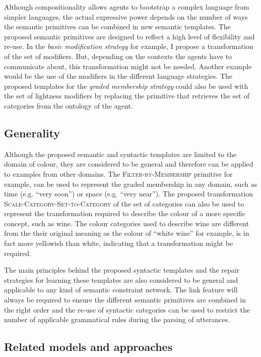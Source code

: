 Although compositionality allows agents to bootstrap a complex
language from simpler languages, the actual expressive power depends
on the number of ways the semantic primitives can be combined in new semantic templates.
The proposed semantic primitives
are designed to reflect a high level of flexibility and re-use. In the
\emph{basic modification strategy} for example, I propose a
transformation of the set of modifiers. But, depending on the contexts
the agents have to communicate about, this transformation
might not be needed. Another example would be the use of the modifiers
in the different language strategies. The proposed templates for the
\emph{graded membership strategy} could also be used with the set of
lightness modifiers by replacing the primitive that retrieves the set
of categories from the ontology of the agent.

\subsection{Generality}

Although the proposed semantic and syntactic templates are limited to
the domain of colour, they are considered to be general and therefore can be
applied to examples from other domains. The
\textsc{Filter-by-Membership} primitive for example, can be used to
represent the graded membership in any domain, such as time
(e.g. ``very soon'') or space (e.g. ``very near''). The proposed
transformation \textsc{Scale-Category-Set-to-Category} of the set of
categories can also be used to represent the transformation required
to describe the colour of a more specific concept, such as wine. The colour
categories used to describe wine are different from the their original
meaning as the colour of ``white wine'' for example, is in fact more
yellowish than white, indicating that a transformation might be required.

The main principles behind the proposed syntactic templates and the repair
strategies for learning these templates are also considered to be
general and applicable to any kind of semantic constraint
network. The link feature will always be required to ensure the
different semantic primitives are combined in the right order and the
re-use of syntactic categories can be used to restrict the number of applicable
grammatical rules during the parsing of utterances.

\subsection{Related models and approaches}

